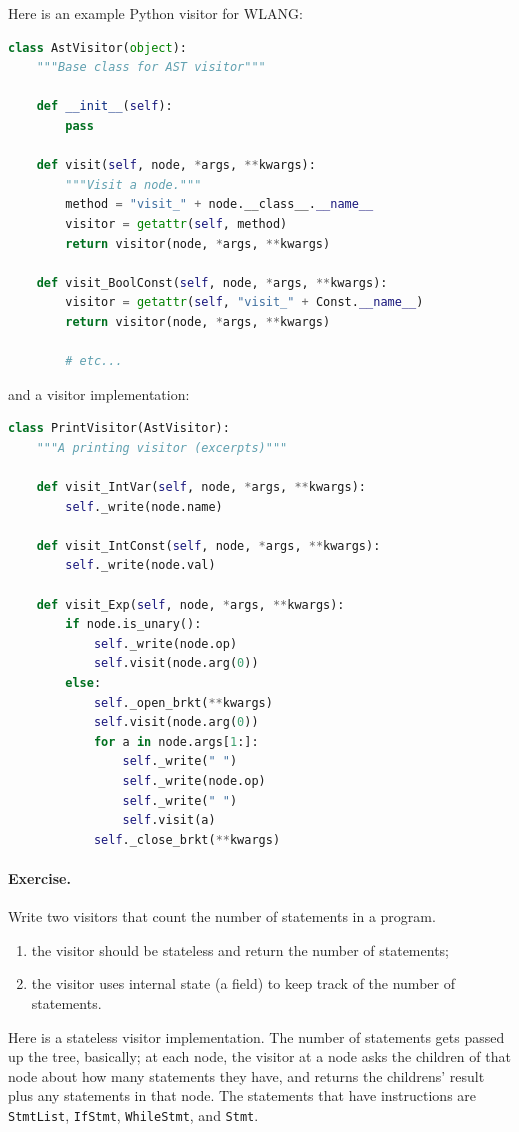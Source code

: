 \documentclass[11pt]{article}
\begin{document}
Here is an example Python visitor for WLANG:
\begin{lstlisting}[language=Python]
class AstVisitor(object):
    """Base class for AST visitor"""

    def __init__(self):
        pass

    def visit(self, node, *args, **kwargs):
        """Visit a node."""
        method = "visit_" + node.__class__.__name__
        visitor = getattr(self, method)
        return visitor(node, *args, **kwargs)

    def visit_BoolConst(self, node, *args, **kwargs):
        visitor = getattr(self, "visit_" + Const.__name__)
        return visitor(node, *args, **kwargs)

        # etc...
\end{lstlisting}
and a visitor implementation:
\begin{lstlisting}[language=Python]
class PrintVisitor(AstVisitor):
    """A printing visitor (excerpts)"""

    def visit_IntVar(self, node, *args, **kwargs):
        self._write(node.name)

    def visit_IntConst(self, node, *args, **kwargs):
        self._write(node.val)

    def visit_Exp(self, node, *args, **kwargs):
        if node.is_unary():
            self._write(node.op)
            self.visit(node.arg(0))
        else:
            self._open_brkt(**kwargs)
            self.visit(node.arg(0))
            for a in node.args[1:]:
                self._write(" ")
                self._write(node.op)
                self._write(" ")
                self.visit(a)
            self._close_brkt(**kwargs)
\end{lstlisting}

\paragraph{Exercise.} Write two visitors that count the number of statements in a program.
\begin{enumerate}[noitemsep]
  \item the visitor should be stateless and return the number of statements;
  \item the visitor uses internal state (a field) to keep track of the number of statements.
\end{enumerate}

Here is a stateless visitor implementation. The number of statements
gets passed up the tree, basically; at each node, the visitor at a
node asks the children of that node about how many statements they
have, and returns the childrens' result plus any statements in that
node. The statements that have instructions are 
\texttt{StmtList}, \texttt{IfStmt}, \texttt{WhileStmt}, and \texttt{Stmt}.
\end{document}
